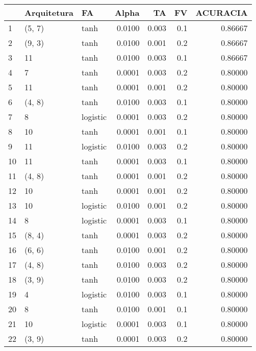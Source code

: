 \begin{tabular}{lllrrrr}
\toprule
{} & Arquitetura &        FA &   Alpha &     TA &   FV &  ACURACIA \\
\midrule
1   &      (5, 7) &      tanh &  0.0100 &  0.003 &  0.1 &   0.86667 \\
2   &      (9, 3) &      tanh &  0.0100 &  0.001 &  0.2 &   0.86667 \\
3   &          11 &      tanh &  0.0100 &  0.003 &  0.1 &   0.86667 \\
4   &           7 &      tanh &  0.0001 &  0.003 &  0.2 &   0.80000 \\
5   &          11 &      tanh &  0.0001 &  0.001 &  0.2 &   0.80000 \\
6   &      (4, 8) &      tanh &  0.0100 &  0.003 &  0.1 &   0.80000 \\
7   &           8 &  logistic &  0.0001 &  0.003 &  0.2 &   0.80000 \\
8   &          10 &      tanh &  0.0001 &  0.001 &  0.1 &   0.80000 \\
9   &          11 &  logistic &  0.0100 &  0.003 &  0.2 &   0.80000 \\
10  &          11 &      tanh &  0.0001 &  0.003 &  0.1 &   0.80000 \\
11  &      (4, 8) &      tanh &  0.0001 &  0.001 &  0.2 &   0.80000 \\
12  &          10 &      tanh &  0.0001 &  0.001 &  0.2 &   0.80000 \\
13  &          10 &  logistic &  0.0100 &  0.001 &  0.2 &   0.80000 \\
14  &           8 &  logistic &  0.0001 &  0.003 &  0.1 &   0.80000 \\
15  &      (8, 4) &      tanh &  0.0001 &  0.003 &  0.2 &   0.80000 \\
16  &      (6, 6) &      tanh &  0.0100 &  0.001 &  0.2 &   0.80000 \\
17  &      (4, 8) &      tanh &  0.0100 &  0.003 &  0.2 &   0.80000 \\
18  &      (3, 9) &      tanh &  0.0100 &  0.003 &  0.2 &   0.80000 \\
19  &           4 &  logistic &  0.0100 &  0.003 &  0.1 &   0.80000 \\
20  &           8 &      tanh &  0.0100 &  0.001 &  0.1 &   0.80000 \\
21  &          10 &  logistic &  0.0001 &  0.003 &  0.1 &   0.80000 \\
22  &      (3, 9) &      tanh &  0.0001 &  0.003 &  0.2 &   0.80000 \\

\end{tabular}
